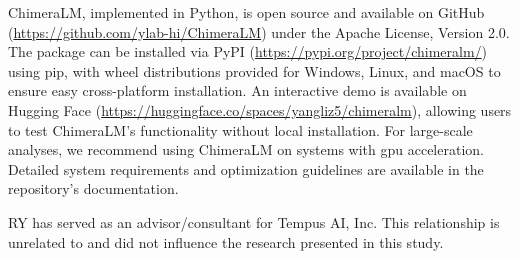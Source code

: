 \documentclass[pdflatex,sn-nature]{sn-jnl}%
\theoremstyle{thmstyleone}%
\theoremstyle{thmstyletwo}%
\theoremstyle{thmstylethree}%
\begin{document}


ChimeraLM, implemented in Python, is open source and available on GitHub (\url{https://github.com/ylab-hi/ChimeraLM}) under the Apache License, Version 2.0.
The package can be installed via PyPI (\url{https://pypi.org/project/chimeralm/}) using pip, with wheel distributions provided for Windows, Linux, and macOS to ensure easy cross-platform installation.
An interactive demo is available on Hugging Face (\url{https://huggingface.co/spaces/yangliz5/chimeralm}), allowing users to test ChimeraLM's functionality without local installation.
For large-scale analyses, we recommend using ChimeraLM on systems with \gls{gpu} acceleration. Detailed system requirements and optimization guidelines are available in the repository's documentation.


RY has served as an advisor/consultant for Tempus AI, Inc. This relationship is unrelated to and did not influence the research presented in this study.


%
\end{document}
